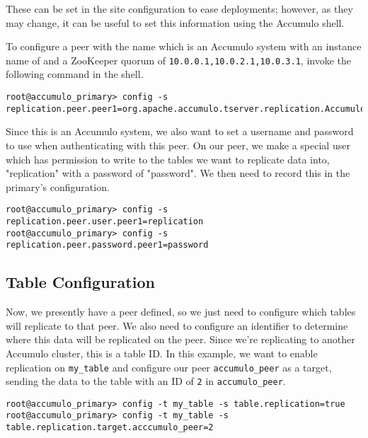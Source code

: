 These can be set in the site configuration to ease deployments; however, as they may
change, it can be useful to set this information using the Accumulo shell.

To configure a peer with the name  which is an Accumulo system with an instance name of
and a ZooKeeper quorum of \texttt{10.0.0.1,10.0.2.1,10.0.3.1}, invoke the following
command in the shell.

\begingroup\fontsize{8pt}{8pt}\selectfont\begin{verbatim}
root@accumulo_primary> config -s
replication.peer.peer1=org.apache.accumulo.tserver.replication.AccumuloReplicaSystem,accumulo_peer,10.0.0.1,10.0.2.1,10.0.3.1
\end{verbatim}\endgroup

Since this is an Accumulo system, we also want to set a username and password
to use when authenticating with this peer. On our peer, we make a special user
which has permission to write to the tables we want to replicate data into, "replication"
with a password of "password". We then need to record this in the primary's configuration.

\begingroup\fontsize{8pt}{8pt}\selectfont\begin{verbatim}
root@accumulo_primary> config -s replication.peer.user.peer1=replication
root@accumulo_primary> config -s replication.peer.password.peer1=password
\end{verbatim}\endgroup

\subsection{Table Configuration}

Now, we presently have a peer defined, so we just need to configure which tables will
replicate to that peer. We also need to configure an identifier to determine where
this data will be replicated on the peer. Since we're replicating to another Accumulo
cluster, this is a table ID. In this example, we want to enable replication on
\texttt{my_table} and configure our peer \texttt{accumulo_peer} as a target, sending
the data to the table with an ID of \texttt{2} in \texttt{accumulo_peer}.

\begingroup\fontsize{8pt}{8pt}\selectfont\begin{verbatim}
root@accumulo_primary> config -t my_table -s table.replication=true
root@accumulo_primary> config -t my_table -s table.replication.target.acccumulo_peer=2
\end{verbatim}\endgroup

